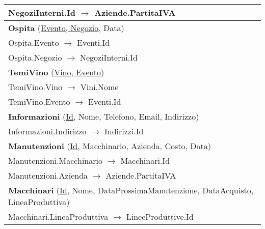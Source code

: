 \begin{center}
\begin{minipage}[t]{7.5cm}
{\begin{tabular}{P{7.5cm}}
				\midrule
				NegoziInterni.Id $\to$ Aziende.PartitaIVA \\                                
				\midrule
				 \textbf{Ospita} (\underline{Evento, Negozio}, Data)                                  \\
				\midrule
				Ospita.Evento $\to$ Eventi.Id                                                                                         \\
				\midrule
				Ospita.Negozio $\to$ NegoziInterni.Id                                                                                 \\                                
				\midrule
				 \textbf{TemiVino} (\underline{Vino, Evento})                                         \\
				\midrule
				TemiVino.Vino $\to$ Vini.Nome                                                                                         \\
				\midrule
				TemiVino.Evento $\to$ Eventi.Id                                                                                       \\                                
				\midrule
				 \textbf{Informazioni} (\underline{Id}, Nome, Telefono, Email, Indirizzo)                                              \\
				\midrule
				Informazioni.Indirizzo $\to$ Indirizzi.Id                                                                                                              \\                                
				\midrule
				 \textbf{Manutenzioni} (\underline{Id}, Macchinario, Azienda, Costo, Data)            \\
				\midrule
				Manutenzioni.Macchinario $\to$ Macchinari.Id                                                                          \\
				\midrule
				Manutenzioni.Azienda $\to$ Aziende.PartitaIVA                                                                                 \\                                
				\midrule
				 \textbf{Macchinari} (\underline{Id}, Nome, DataProssimaManutenzione, DataAcquisto, LineaProduttiva)                   \\
				\midrule
				Macchinari.LineaProduttiva $\to$ LineeProduttive.Id                                                                                                    \\                                

\end{tabular}}
\end{minipage}
\end{center}
